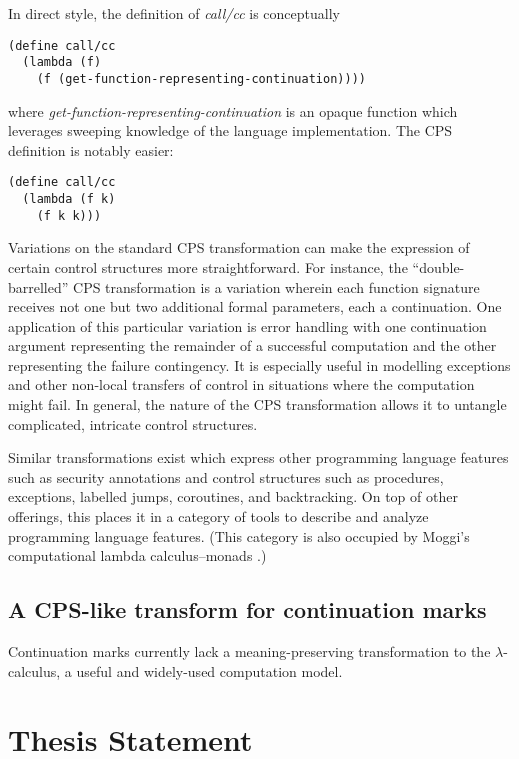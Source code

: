\documentclass[11pt,ms]{byuprop}
\newcounter{definition}
\begin{document}
In direct style, the definition of \emph{call/cc} is conceptually 
\begin{verbatim}
(define call/cc
  (lambda (f)
    (f (get-function-representing-continuation))))
\end{verbatim}
where \emph{get-function-representing-continuation} is an opaque function which 
leverages sweeping knowledge of the language implementation. The CPS definition 
is notably easier:
\begin{verbatim}
(define call/cc
  (lambda (f k)
    (f k k)))
\end{verbatim}

Variations on the standard CPS transformation can make the expression of certain 
control structures more straightforward. For instance, the ``double-barrelled'' 
CPS transformation is a variation wherein each function signature receives not 
one but two additional formal parameters, each a continuation. One application 
of this particular variation is error handling with one continuation argument 
representing the remainder of a successful computation and the other representing 
the failure contingency. It is especially useful in modelling exceptions and 
other non-local transfers of control in situations where the computation might fail.
In general, the nature of the CPS transformation allows it to untangle 
complicated, intricate control structures.

Similar transformations exist which express other programming language features 
such as security annotations \cite{wallach2000safkasi} and control structures 
such as procedures, exceptions, labelled jumps, coroutines, and 
backtracking. On top of other offerings, this places it in a category of tools 
to describe and analyze programming language features. (This category is also 
occupied by Moggi's computational lambda calculus--monads 
\cite{moggi1989computational}.)

\subsection{A CPS-like transform for continuation marks}

Continuation marks currently lack a meaning-preserving transformation to the
$\lambda$-calculus, a useful and widely-used computation model.

\section{Thesis Statement}
\end{document}

